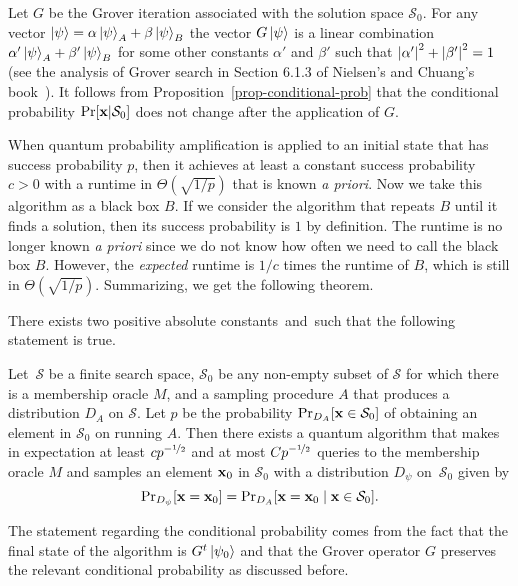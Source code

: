 \documentclass[a4paper,11pt]{article}
\begin{document}
Let $G$ be the Grover iteration associated with the solution space $\mathcal{S}_0$. For any vector $\left\vert \psi \right\rangle = \alpha \left\vert \psi \right\rangle_A + \beta\left\vert \psi \right\rangle_B$ the vector $G\left\vert \psi \right\rangle$ is a linear combination $\alpha' \left\vert \psi \right\rangle_A + \beta' \left\vert \psi \right\rangle_B$ for some other constants $\alpha'$ and $\beta'$ such that $\left\vert \alpha' \right\vert^2 + \left\vert \beta' \right\vert^2 = 1$ (see the analysis of Grover search in Section 6.1.3 of Nielsen's and Chuang's book~\cite{nielsenchuang:book}). It follows from Proposition~\ref{prop-conditional-prob} that the conditional probability $\Pr[\xvec|\mathcal{S}_0]$ does not change after the application of $G$.

When quantum probability amplification is applied to an initial state that has success probability $p$, then it achieves at least a constant success probability~$c>0$ with a runtime in $\Theta(\sqrt{1/p})$ that is known \emph{a priori}. Now we take this algorithm as a black box $B$. If we consider the algorithm that repeats $B$ until it finds a solution, then its success probability is $1$ by definition. The runtime is no longer known \emph{a priori} since we do not know how often we need to call the black box $B$. However, the \emph{expected} runtime is $1/c$ times the runtime of $B$, which is still in $\Theta(\sqrt{1/p})$. Summarizing, we get the following theorem.

\begin{theorem}\label{thm:probamp}
There exists two positive absolute constants~\lb and~\ub such that the following statement is true. 

Let~$\mathcal{S}$ be a finite search space, $\mathcal{S}_0$ be any
non-empty subset of $\mathcal{S}$ for which there is a membership
oracle $M$, and a sampling procedure $A$ that produces a distribution
$D_A$ on $\mathcal{S}$. Let $p$ be the probability $\Pr_{D_A}[\xvec
  \in\mathcal{S}_0]$ of obtaining an element in $\mathcal{S}_0$ on
running $A$. Then there exists a quantum algorithm that makes in
  expectation at least $c p^{-\nicefrac{1}{2}}$ and at most $C
p^{-\nicefrac{1}{2}}$ queries to the membership oracle $M$ and samples
an element $\xvec_0$ in $\mathcal{S}_0$ with a distribution $D_\psi$
on~$\mathcal{S}_0$ given by
 \[ 
 {\Pr}_{D_\psi}[\xvec=\xvec_0] = {\Pr}_{D_A}[\xvec=\xvec_0\mid \xvec\in\mathcal{S}_0]. 
 \]
\end{theorem}

The statement regarding the conditional probability comes from the fact that the final state of the algorithm is $G^t\left\vert \psi_0 \right\rangle$ and that the Grover operator $G$ preserves the relevant conditional probability as discussed before.
\end{document}
